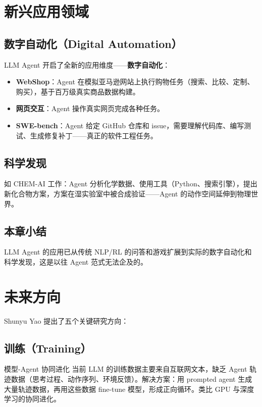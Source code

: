 \documentclass[a4paper]{article}
\begin{document}
\section{新兴应用领域}

\subsection{数字自动化（Digital Automation）}

LLM Agent 开启了全新的应用维度——\textbf{数字自动化}：

\begin{itemize}
    \item \textbf{WebShop}：Agent 在模拟亚马逊网站上执行购物任务（搜索、比较、定制、购买），基于百万级真实商品数据构建。
    \item \textbf{网页交互}：Agent 操作真实网页完成各种任务。
    \item \textbf{SWE-bench}：Agent 给定 GitHub 仓库和 issue，需要理解代码库、编写测试、生成修复补丁——真正的软件工程任务。
\end{itemize}

\subsection{科学发现}

如 CHEM-AI 工作：Agent 分析化学数据、使用工具（Python、搜索引擎），提出新化合物方案，方案在湿实验室中被合成验证——Agent 的动作空间延伸到物理世界。

\subsection{本章小结}

LLM Agent 的应用已从传统 NLP/RL 的问答和游戏扩展到实际的数字自动化和科学发现，这是以往 Agent 范式无法企及的。

\section{未来方向}

Shunyu Yao 提出了五个关键研究方向：

\subsection{训练（Training）}

\begin{importantbox}{模型-Agent 协同进化}
当前 LLM 的训练数据主要来自互联网文本，缺乏 Agent 轨迹数据（思考过程、动作序列、环境反馈）。解决方案：用 prompted agent 生成大量轨迹数据，再用这些数据 fine-tune 模型，形成正向循环。类比 GPU 与深度学习的协同进化。
\end{importantbox}
\end{document}
